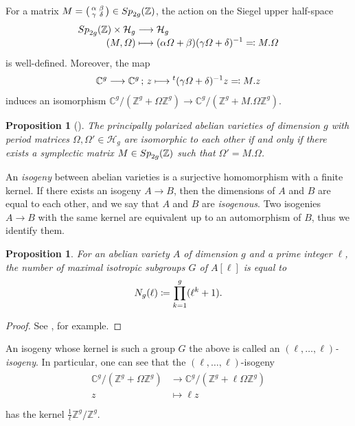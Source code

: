 \documentclass{amsart}
\theoremstyle{definition}
\theoremstyle{plain}
\newtheorem{Prop}[Def]{Proposition}
\begin{document}
For a matrix $M = \begin{psmallmatrix} \alpha & \beta\\[-0.3mm] \gamma & \delta\end{psmallmatrix} \in {\rm Sp}_{2g}(\mathbb{Z})$, the action on the Siegel upper half-space\smallskip
\begin{align*}
    \begin{split}
    {\rm Sp}_{2g}(\mathbb{Z}) \times \mathcal{H}_g  &\longrightarrow \mathcal{H}_g\\[-1mm]
    (M,\varOmega) &\longmapsto (\alpha\varOmega+\beta)(\gamma\varOmega+\delta)^{-1} \eqqcolon M.\varOmega\\[0.3mm]
    \end{split}
\end{align*}
is well-defined. Moreover, the map
\[
    \mathbb{C}^g \longrightarrow \mathbb{C}^g\,;\,z \longmapsto {}^t(\gamma\varOmega+\delta)^{-1}z \eqqcolon M.z\medskip
\]
induces an isomorphism $\mathbb{C}^g/(\mathbb{Z}^g + \varOmega\mathbb{Z}^g) \rightarrow \mathbb{C}^g/(\mathbb{Z}^g + M.\varOmega\mathbb{Z}^g)$.
\begin{Prop}[{\cite[Proposition 8.1.3]{Lange}}]\label{isom}
The principally polarized abelian varieties of dimension $g$ with period matrices $\varOmega,\varOmega' \in \mathcal{H}_g$ are isomorphic to each other if and only if there exists a symplectic matrix $M \in {\rm Sp}_{2g}(\mathbb{Z})$ such that $\varOmega' = M.\varOmega$.
\end{Prop}\medskip

An \emph{isogeny} between abelian varieties is a surjective homomorphism with a finite kernel.
If there exists an isogeny $A \rightarrow B$, then the dimensions of $A$ and $B$ are equal to each other, and we say that $A$ and $B$ are \emph{isogenous}.
Two isogenies $A \rightarrow B$ with the same kernel are equivalent up to an automorphism of $B$, thus we identify them.
\begin{Prop}\label{maxisonum}
For an abelian variety $A$ of dimension $g$ and a prime integer $\ell$, the number of maximal isotropic subgroups $G$ of $A[\ell]$ is equal to
\[
    N_g(\ell) \coloneqq \prod_{k=1}^g(\ell^k+1).\smallskip
\]
\end{Prop}
\begin{proof}
See \cite[Lemma 2]{CD}, for example.
\end{proof}
\noindent An isogeny whose kernel is such a group $G$ the above is called an \emph{$(\ell,\dots,\ell)$-isogeny}.
In particular, one can see that the $(\ell,\ldots,\ell)$-isogeny\smallskip
\begin{align*}
    \begin{split}
    \mathbb{C}^g/(\mathbb{Z}^g + \varOmega\mathbb{Z}^g) &\longrightarrow \mathbb{C}^g/(\mathbb{Z}^g + \ell\varOmega\mathbb{Z}^g)\\[-0.5mm]
    z &\longmapsto \ell z\\[-0.3mm]
    \end{split}
\end{align*}
has the kernel $\frac{1}{\ell}\mathbb{Z}^g/\mathbb{Z}^g$.
\end{document}
